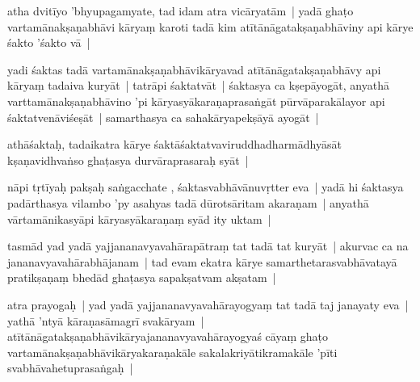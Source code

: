 \documentclass[article,12pt,a4paper]{memoir}%
\newcounter{parCount}
\begin{document}
	  
	  \pstart \leavevmode%
	\label{thakur75-68.4}atha dvitīyo 'bhyupagamyate, tad idam atra vicāryatām | yadā ghaṭo vartamānakṣaṇabhāvi kāryaṃ karoti tadā kim atītānāgatakṣaṇabhāviny api kārye śakto 'śakto vā |
	{}
	\pend%
      

	  
	  \pstart \leavevmode%
	\label{thakur75-68.6}yadi śaktas tadā vartamānakṣaṇabhāvikāryavad atītānāgatakṣaṇabhāvy api kāryaṃ tadaiva kuryāt | tatrāpi śaktatvāt | śaktasya ca kṣepāyogāt, anyathā varttamānakṣaṇabhāvino 'pi kāryasyākaraṇaprasaṅgāt pūrvāparakālayor api śaktatvenāviśeṣāt | samarthasya ca sahakāryapekṣāyā ayogāt | 
	{}
	\pend%
      

	  
	  \pstart \leavevmode%
	\label{thakur75-68.9}athāśaktaḥ, tadaikatra kārye śaktāśaktatvaviruddhadharmādhyāsāt kṣaṇavidhvaṅso ghaṭasya durvāraprasaraḥ syāt |
	{}
	\pend%
      

	  
	  \pstart \leavevmode%
	\label{thakur75-68.11}nāpi tṛtīyaḥ pakṣaḥ saṅgacchate , śaktasvabhāvānuvṛtter eva | yadā hi śaktasya padārthasya vilambo 'py asahyas tadā dūrotsāritam akaraṇam | anyathā vārtamānikasyāpi kāryasyākaraṇaṃ syād ity uktam | 
	{}
	\pend%
      

	  
	  \pstart \leavevmode%
	\label{thakur75-68.14}tasmād yad yadā yajjananavyavahārapātraṃ tat tadā tat kuryāt | akurvac ca na jananavyavahārabhājanam | tad evam ekatra kārye samarthetarasvabhāvatayā pratikṣaṇaṃ bhedād ghaṭasya sapakṣatvam akṣatam |
	{}
	\pend%
      

	  
	  \pstart \leavevmode%
	\label{thakur75-68.17}atra prayogaḥ | yad yadā yajjananavyavahārayogyaṃ tat tadā taj janayaty eva | yathā 'ntyā kāraṇasāmagrī svakāryam | atītānāgatakṣaṇabhāvikāryajananavyavahārayogyaś cāyaṃ ghaṭo vartamānakṣaṇabhāvikāryakaraṇakāle sakalakriyātikramakāle 'pīti svabhāvahetuprasaṅgaḥ |
	{}
	\pend%
      
\end{document}
